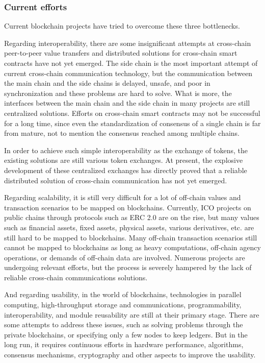\documentclass[a4paper,12pt]{article}
\begin{document}
\subsubsection{Current efforts}

Current blockchain projects have tried to overcome these three bottlenecks.

Regarding interoperability, there are some insignificant attempts at cross-chain peer-to-peer value transfers and distributed solutions for cross-chain smart contracts have not yet emerged. The side chain is the most important attempt of current cross-chain communication technology, but the communication between the main chain and the side chains is delayed, unsafe, and poor in synchronization and these problems are hard to solve. What is more, the interfaces between the main chain and the side chain in many projects are still centralized solutions. Efforts on cross-chain smart contracts may not be successful for a long time, since even the standardization of consensus of a single chain is far from mature, not to mention the consensus reached among multiple chains. 

In order to achieve such simple interoperability as the exchange of tokens, the existing solutions are still various token exchanges. At present, the explosive development of these centralized exchanges has directly proved that a reliable distributed solution of cross-chain communication has not yet emerged.

Regarding scalability, it is still very difficult for a lot of off-chain values and transaction scenarios to be mapped on blockchains. Currently, ICO projects on public chains through protocols such as ERC 2.0 are on the rise, but many values such as financial assets, fixed assets, physical assets, various derivatives, etc. are still hard to be mapped to blockchains. Many off-chain transaction scenarios still cannot be mapped to blockchains as long as heavy computations, off-chain agency operations, or demands of off-chain data are involved. Numerous projects are undergoing relevant efforts, but the process is severely hampered by the lack of reliable cross-chain communications solutions.

And regarding usability, in the world of blockchains, technologies in parallel computing, high-throughput storage and communications, programmability, interoperability, and module reusability are still at their primary stage. There are some attempts to address these issues, such as solving problems through the private blockchains, or specifying only a few nodes to keep ledgers. But in the long run, it requires continuous efforts in hardware performance, algorithms, consensus mechanisms, cryptography and other aspects to improve the usability.
\end{document}
